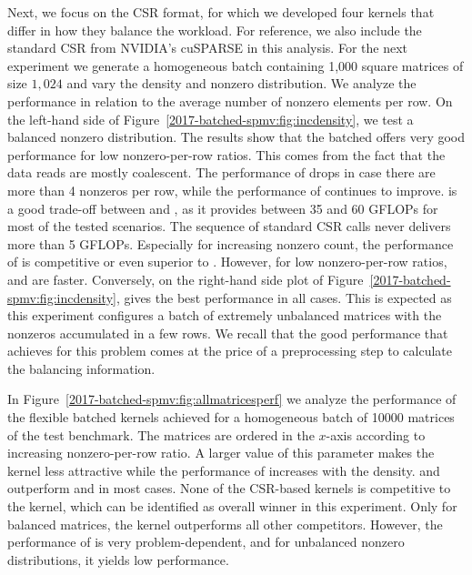 Next, we focus on the CSR format, for which we developed four kernels that 
differ in how they balance the workload.
For reference, we also include the standard CSR \spmv from NVIDIA's cuSPARSE in 
this analysis.
For the next experiment we generate a homogeneous batch containing 1,000 square 
matrices 
of size $1,024$
and vary the density and nonzero distribution.
We analyze the performance in relation to the average number of nonzero 
elements per row.
On the left-hand side of Figure~\ref{2017-batched-spmv:fig:incdensity}, we test a balanced 
nonzero distribution. 
The results show that the batched \csrscal offers very good performance for low 
nonzero-per-row ratios.
This comes from the fact that the data reads are mostly coalescent. The 
performance of \csrscal
drops in case there are more than 4 nonzeros per row, while the performance of 
\csrvec continues to improve.
\csrsmart  is a good trade-off between \csrscal and \csrvec, as it provides 
between 35 and 60 GFLOPs 
for most of the tested scenarios. 
The sequence of standard CSR \spmv calls never delivers more than 5 GFLOPs.
Especially for increasing nonzero count, the performance of \csri is 
competitive or even superior to \csrsmart.
However, for low nonzero-per-row ratios, \csrscal and \csrsmart are faster.
Conversely, on the right-hand side plot of Figure~\ref{2017-batched-spmv:fig:incdensity}, \csri 
gives the best performance
in all cases. This is expected as this experiment configures 
a batch of extremely unbalanced matrices with the nonzeros accumulated in a few 
rows. 
We recall that the good performance that \csri achieves for this problem comes 
at the price of a preprocessing
step to calculate the balancing information.

In Figure~\ref{2017-batched-spmv:fig:allmatricesperf} we analyze the performance of the flexible 
batched \spmv
kernels achieved for a homogeneous batch of 10000 matrices of the test 
benchmark.
The matrices are ordered in the $x$-axis 
according to increasing nonzero-per-row ratio. 
A larger value of this parameter 
makes the \csrscal kernel less attractive while the performance 
of \csrvec increases with the density. 
\csri and \csrsmart outperform \csrvec and \csrscal in most cases. 
None of the CSR-based kernels is competitive to the \coo kernel, which 
can be identified as overall winner in this experiment.
Only for balanced matrices, the \ell kernel outperforms all other competitors.
However, the performance of \ell is very problem-dependent, and for 
unbalanced nonzero distributions, it yields low performance.




